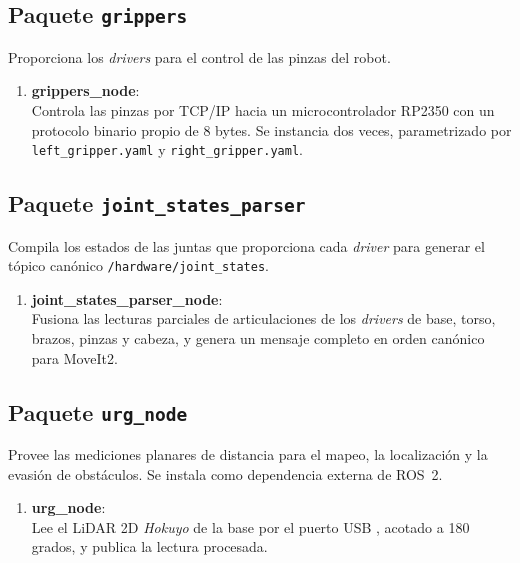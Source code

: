 \subsection{Paquete \texttt{grippers}}

Proporciona los \textit{drivers} para el control de las pinzas del robot.

\begin{enumerate}

\item \textbf{grippers\_node}: \\
Controla las pinzas por TCP/IP hacia un microcontrolador RP2350 con un protocolo binario propio de 8 bytes. Se instancia dos veces, parametrizado por \texttt{left\_gripper.yaml} y \texttt{right\_gripper.yaml}.

\end{enumerate}

\subsection{Paquete \texttt{joint\_states\_parser}}

Compila los estados de las juntas que proporciona cada \textit{driver} para generar el tópico canónico \texttt{/hardware/joint\_states}.

\begin{enumerate}

\item \textbf{joint\_states\_parser\_node}: \\
Fusiona las lecturas parciales de articulaciones de los \textit{drivers} de base, torso, brazos, pinzas y cabeza, y genera un mensaje completo en orden canónico para MoveIt2.

\end{enumerate}

\subsection{Paquete \texttt{urg\_node}}

Provee las mediciones planares de distancia para el mapeo, la localización y la evasión de obstáculos. Se instala como dependencia externa de ROS~2.

\begin{enumerate}

\item \textbf{urg\_node}: \\
Lee el LiDAR 2D \emph{Hokuyo} de la base por el puerto USB , acotado a 180 grados, y publica la lectura procesada.

\end{enumerate}
